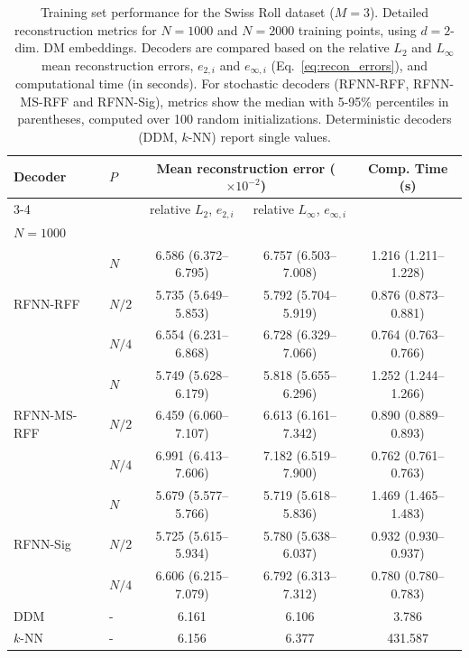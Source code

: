 \documentclass{article}
\begin{document}
\begin{table}[htbp]
\centering
\caption{Training set performance for the Swiss Roll dataset ($M=3$). Detailed reconstruction metrics for $N=1000$ and $N=2000$ training points, using $d=2$-dim. DM embeddings. Decoders are compared based on the relative $L_2$ and $L_\infty$ mean reconstruction errors, $e_{2,i}$ and $e_{\infty,i}$ (Eq.~\eqref{eq:recon_errors}), and computational time (in seconds). For stochastic decoders (RFNN-RFF, RFNN-MS-RFF and RFNN-Sig), metrics show the median with 5-95\% percentiles in parentheses, computed over 100 random initializations. Deterministic decoders (DDM, $k$-NN) report single values.}
\label{tab:SR_dec_tr_all}
\begin{tabular}{@{}llccc@{}}
\multirow{2}{*}{Decoder} & \multirow{2}{*}{$P$} & \multicolumn{2}{c}{Mean reconstruction error ($\times 10^{-2}$)} & \multirow{2}{*}{Comp. Time (s)} \\
\cmidrule(lr){3-4}
& & relative $L_2$, $e_{2,i}$ &  relative $L_\infty$, $e_{\infty,i}$ &  \\
\midrule
\multicolumn{5}{l}{\textbf{$N=1000$}} \\
\midrule
\midrule

\multirow{3}{*}{RFNN-RFF} 
&	$N$	    & 6.586 (6.372--6.795) & 6.757 (6.503--7.008) & 1.216 (1.211--1.228) \\
&	$N/2$	& 5.735 (5.649--5.853) & 5.792 (5.704--5.919) & 0.876 (0.873--0.881) \\
&	$N/4$	& 6.554 (6.231--6.868) & 6.728 (6.329--7.066) & 0.764 (0.763--0.766) \\
\midrule

\multirow{3}{*}{RFNN-MS-RFF} 
&	$N$	    & 5.749 (5.628--6.179) & 5.818 (5.655--6.296) & 1.252 (1.244--1.266) \\
&	$N/2$	& 6.459 (6.060--7.107) & 6.613 (6.161--7.342) & 0.890 (0.889--0.893) \\
&	$N/4$	& 6.991 (6.413--7.606) & 7.182 (6.519--7.900) & 0.762 (0.761--0.763) \\
\midrule

\multirow{3}{*}{RFNN-Sig} 
& $N$   & 5.679 (5.577--5.766) & 5.719 (5.618--5.836) & 1.469 (1.465--1.483) \\
& $N/2$ & 5.725 (5.615--5.934) & 5.780 (5.638--6.037) & 0.932 (0.930--0.937) \\
& $N/4$ & 6.606 (6.215--7.079) & 6.792 (6.313--7.312) & 0.780 (0.780--0.783) \\
\midrule
DDM  & - & 6.161 & 6.106 & 3.786   \\
$k$-NN & - & 6.156 & 6.377 & 431.587 \\


\end{tabular}
\end{table}
\end{document}
